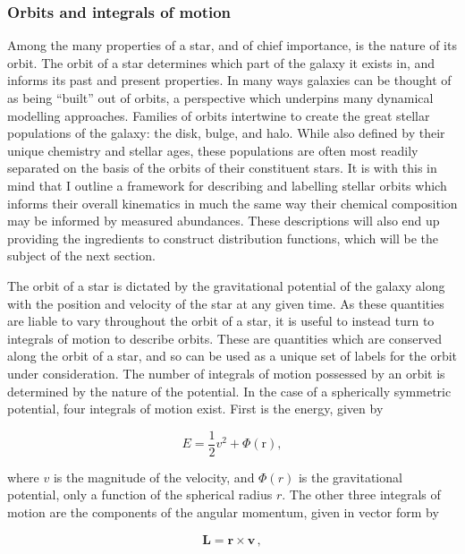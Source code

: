 \subsubsection{Orbits and integrals of motion}

Among the many properties of a star, and of chief importance, is the nature of its orbit. The orbit of a star determines which part of the galaxy it exists in, and informs its past and present properties. In many ways galaxies can be thought of as being ``built'' out of orbits, a perspective which underpins many dynamical modelling approaches. Families of orbits intertwine to create the great stellar populations of the galaxy: the disk, bulge, and halo. While also defined by their unique chemistry and stellar ages, these populations are often most readily separated on the basis of the orbits of their constituent stars. It is with this in mind that I outline a framework for describing and labelling stellar orbits which informs their overall kinematics in much the same way their chemical composition may be informed by measured abundances. These descriptions will also end up providing the ingredients to construct distribution functions, which will be the subject of the next section.

The orbit of a star is dictated by the gravitational potential of the galaxy along with the position and velocity of the star at any given time. As these quantities are liable to vary throughout the orbit of a star, it is useful to instead turn to integrals of motion to describe orbits. These are quantities which are conserved along the orbit of a star, and so can be used as a unique set of labels for the orbit under consideration. The number of integrals of motion possessed by an orbit is determined by the nature of the potential. In the case of a spherically symmetric potential, four integrals of motion exist. First is the energy, given by 

\begin{equation}
    \label{ch1:eq:energy}
    E = \frac{1}{2}v^2 + \Phi(\mathbf{\mathrm{r}}),
\end{equation}

\noindent where $v$ is the magnitude of the velocity, and $\Phi(r)$ is the gravitational potential, only a function of the spherical radius $r$. The other three integrals of motion are the components of the angular momentum, given in vector form by

\begin{equation}
    \label{ch1:eq:angular-momentum}
    \mathbf{L} = \mathbf{r} \times \mathbf{v}\,,
\end{equation}

